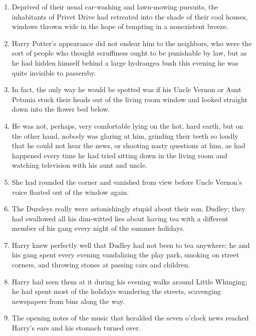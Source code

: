 \begin{enumerate}
	\item Deprived of their usual car-washing and lawn-mowing pursuits, the inhabitants of Privet Drive had retreated into the shade of their cool houses, windows thrown wide in the hope of tempting in a nonexistent breeze.
	
	\item Harry Potter's appearance did not endear him to the neighbors, who were the sort of people who thought scruffiness ought to be punishable by law, but as he had hidden himself behind a large hydrangea bush this evening he was quite invisible to passersby.
	
	\item In fact, the only way he would be spotted was if his Uncle Vernon or Aunt Petunia stuck their heads out of the living room window and looked straight down into the flower bed below.
	
	\item He was not, perhaps, very comfortable lying on the hot, hard earth, but on the other hand, nobody was glaring at him, grinding their teeth so loudly that he could not hear the news, or shooting nasty questions at him, as had happened every time he had tried sitting down in the living room and watching television with his aunt and uncle.
	
	\item She had rounded the corner and vanished from view before Uncle Vernon's voice floated out of the window again.
	
	\item The Dursleys really were astonishingly stupid about their son, Dudley; they had swallowed all his dim-witted lies about having tea with a different member of his gang every night of the summer holidays.
	
	\item Harry knew perfectly well that Dudley had not been to tea anywhere; he and his gang spent every evening vandalizing the play park, smoking on street corners, and throwing stones at passing cars and children.
	
	\item Harry had seen them at it during his evening walks around Little Whinging; he had spent most of the holidays wandering the streets, scavenging newspapers from bins along the way.
	
	\item The opening notes of the music that heralded the seven o'clock news reached Harry's ears and his stomach turned over.
	

\end{enumerate}
